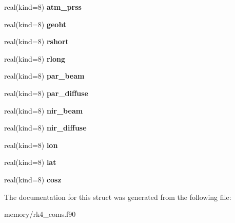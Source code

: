 \begin{DoxyCompactItemize}
\item 
\hypertarget{structrk4__coms_1_1rk4sitetype_a890b778d686187aa6ffe05954b08be0a}{
real(kind=8) {\bfseries atm\_\-prss}}
\label{structrk4__coms_1_1rk4sitetype_a890b778d686187aa6ffe05954b08be0a}

\item 
\hypertarget{structrk4__coms_1_1rk4sitetype_a53991406683324c043c9698d9f5fed5f}{
real(kind=8) {\bfseries geoht}}
\label{structrk4__coms_1_1rk4sitetype_a53991406683324c043c9698d9f5fed5f}

\item 
\hypertarget{structrk4__coms_1_1rk4sitetype_af79527d4a144d7cbc0e85ea433d4d736}{
real(kind=8) {\bfseries rshort}}
\label{structrk4__coms_1_1rk4sitetype_af79527d4a144d7cbc0e85ea433d4d736}

\item 
\hypertarget{structrk4__coms_1_1rk4sitetype_a35e8637a2b0671ae8e77be899aba8f58}{
real(kind=8) {\bfseries rlong}}
\label{structrk4__coms_1_1rk4sitetype_a35e8637a2b0671ae8e77be899aba8f58}

\item 
\hypertarget{structrk4__coms_1_1rk4sitetype_aff32d50f5afa6f73964717ce6953f374}{
real(kind=8) {\bfseries par\_\-beam}}
\label{structrk4__coms_1_1rk4sitetype_aff32d50f5afa6f73964717ce6953f374}

\item 
\hypertarget{structrk4__coms_1_1rk4sitetype_a4f19a1ac952b2fe5b26bd181478dc1b0}{
real(kind=8) {\bfseries par\_\-diffuse}}
\label{structrk4__coms_1_1rk4sitetype_a4f19a1ac952b2fe5b26bd181478dc1b0}

\item 
\hypertarget{structrk4__coms_1_1rk4sitetype_a20c28ea17dfc262d1b678f2f475fd430}{
real(kind=8) {\bfseries nir\_\-beam}}
\label{structrk4__coms_1_1rk4sitetype_a20c28ea17dfc262d1b678f2f475fd430}

\item 
\hypertarget{structrk4__coms_1_1rk4sitetype_a47d87bf81fdf6aef275a6815d66106a4}{
real(kind=8) {\bfseries nir\_\-diffuse}}
\label{structrk4__coms_1_1rk4sitetype_a47d87bf81fdf6aef275a6815d66106a4}

\item 
\hypertarget{structrk4__coms_1_1rk4sitetype_ac2e94b56cfe42e1238c4828f3917a879}{
real(kind=8) {\bfseries lon}}
\label{structrk4__coms_1_1rk4sitetype_ac2e94b56cfe42e1238c4828f3917a879}

\item 
\hypertarget{structrk4__coms_1_1rk4sitetype_a6d32b408482d308a1b87d1829862b7a4}{
real(kind=8) {\bfseries lat}}
\label{structrk4__coms_1_1rk4sitetype_a6d32b408482d308a1b87d1829862b7a4}

\item 
\hypertarget{structrk4__coms_1_1rk4sitetype_a934fde3983522e3b95d78d5e1f2e1524}{
real(kind=8) {\bfseries cosz}}
\label{structrk4__coms_1_1rk4sitetype_a934fde3983522e3b95d78d5e1f2e1524}

\end{DoxyCompactItemize}


The documentation for this struct was generated from the following file:\begin{DoxyCompactItemize}
\item 
memory/rk4\_\-coms.f90\end{DoxyCompactItemize}
